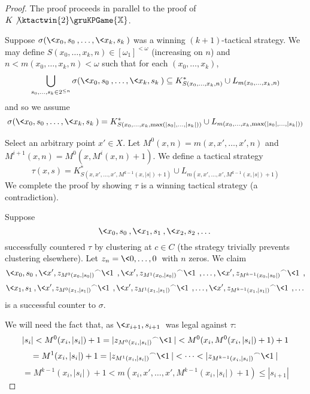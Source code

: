 \begin{proof}
The proof proceeds in parallel to the proof of $K\not\ktactwin{2}\gruKPGame{\mathbb{X}}$.

Suppose $\sigma(\<x_0,s_0\>,\dots,\<x_{k},s_{k}\>)$ was a winning $(k+1)$-tactical strategy. We may define $S(x_0,\dots,x_{k},n)\in [\omega_1]^{<\omega}$ (increasing on $n$) and $n<m(x_0,\dots,x_{k},n)<\omega$ such that for each $(x_0,\dots,x_{k})$,
  \[
    \bigcup_{s_0,\dots,s_k \in 2^{\leq n}} \sigma(\<x_0,s_0\>,\dots,\<x_{k},s_{k}\>) \subseteq
    K^*_{S(x_0,\dots,x_{k},n)} \cup L_{m(x_0,\dots,x_{k},n)}
  \]
and so we assume
  \[
    \sigma(\<x_0,s_0\>,\dots,\<x_{k},s_{k}\>) =
    K^*_{S(x_0,\dots,x_{k},\max(|s_0|,\dots,|s_k|))} \cup L_{m(x_0,\dots,x_{k},\max(|s_0|,\dots,|s_k|))}
  \]

Select an arbitrary point $x' \in X$. Let $M^0(x,n)=m(x,x',\dots,x',n)$ and $M^{i+1}(x,n)=M^0(x,M^i(x,n)+1)$. We define a tactical strategy
  \[
  \tau(x,s) = K^*_{S(x,x',\dots,x',M^{k-1}(x,|s|)+1)} \cup L_{m(x,x',\dots,x',M^{k-1}(x,|s|)+1)}
  \]
We complete the proof by showing $\tau$ is a winning tactical strategy (a contradiction).

Suppose
\[
\<x_0, s_0\>, \<x_1, s_1\>, \<x_2, s_2\>, \dots
\]
successfully countered $\tau$ by clustering at $c\in C$ (the strategy trivially prevents clustering elsewhere). Let $z_n = \<0,\dots,0\>$ with $n$ zeros. We claim
\[
  \<x_0, s_0\>,
  \<x', {z_{M^0(x_0,|s_0|)}}^\frown\<1\>\>,
  \<x', {z_{M^1(x_0,|s_0|)}}^\frown\<1\>\>,
  \dots,
  \<x', {z_{M^{k-1}(x_0,|s_0|)}}^\frown\<1\>\>,
\]
\[
  \<x_1, s_1\>,
  \<x', {z_{M^0(x_1,|s_1|)}}^\frown\<1\>\>,
  \<x', {z_{M^1(x_1,|s_1|)}}^\frown\<1\>\>,
  \dots,
  \<x', {z_{M^{k-1}(x_1,|s_1|)}}^\frown\<1\>\>,
  \dots
\]
is a successful counter to $\sigma$.

We will need the fact that, as $\<x_{i+1},s_{i+1}\>$ was legal against $\tau$:
  \[
    |s_i| <
    M^0(x_i,|s_i|)+1 =
    |{z_{M^0(x_i,|s_i|)}}^\frown\<1\>| <
    M^0(x_i,M^0(x_i,|s_i|)+1)+1
  \]
  \[
    =
    M^1(x_i,|s_i|)+1 =
    |{z_{M^1(x_i,|s_i|)}}^\frown\<1\>| <
    \dots <
    |{z_{M^{k-1}(x_i,|s_i|)}}^\frown\<1\>|
  \]
  \[
    =
    M^{k-1}(x_i,|s_i|) + 1 <
    m(x_i,x',\dots,x',M^{k-1}(x_i,|s_i|)+1) \leq
    |s_{i+1}|
  \]


\end{proof}
